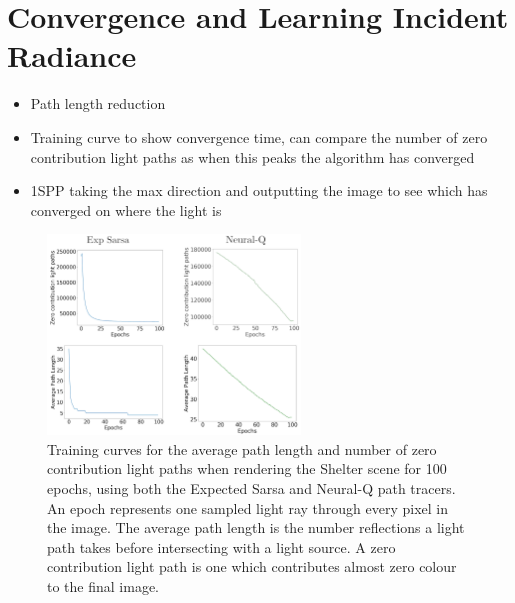 \documentclass[../dissertation.tex]{subfiles}
\begin{document}
\section{Convergence and Learning Incident Radiance}
\label{sec:convergence_learning_incident}
\begin{itemize}
\item Path length reduction
\item Training curve to show convergence time, can compare the number of zero contribution light paths as when this peaks the algorithm has converged
\item 1SPP taking the max direction and outputting the image to see which has converged on where the light is
\end{itemize}

\begin{figure}[h]
\begin{center}
\includegraphics[width=0.6\textwidth]{images/training_curves.png}    
\end{center}
\caption{Training curves for the average path length and number of zero contribution light paths when rendering the Shelter scene for 100 epochs, using both the Expected Sarsa and Neural-Q path tracers. An epoch represents one sampled light ray through every pixel in the image. The average path length is the number reflections a light path takes before intersecting with a light source. A zero contribution light path is one which contributes almost zero colour to the final image.}
\label{fig:training_curves_archway}
\end{figure}
\end{document}
